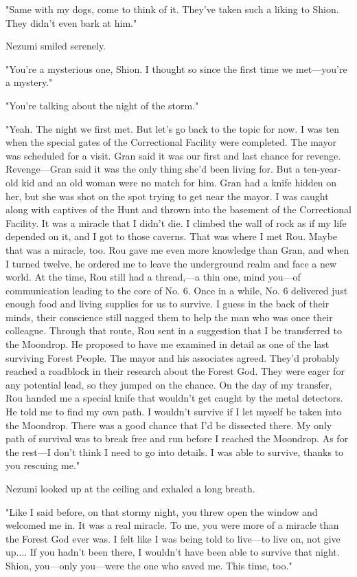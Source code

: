 "Same with my dogs, come to think of it. They've taken such a liking to
Shion. They didn't even bark at him."

Nezumi smiled serenely.

"You're a mysterious one, Shion. I thought so since the first time we
met---you're a mystery."

"You're talking about the night of the storm."

"Yeah. The night we first met. But let's go back to the topic for now. I
was ten when the special gates of the Correctional Facility were
completed. The mayor was scheduled for a visit. Gran said it was our
first and last chance for revenge. Revenge---Gran said it was the only
thing she'd been living for. But a ten-year-old kid and an old woman
were no match for him. Gran had a knife hidden on her, but she was shot
on the spot trying to get near the mayor. I was caught along with
captives of the Hunt and thrown into the basement of the Correctional
Facility. It was a miracle that I didn't die. I climbed the wall of rock
as if my life depended on it, and I got to those caverns. That was where
I met Rou. Maybe that was a miracle, too. Rou gave me even more
knowledge than Gran, and when I turned twelve, he ordered me to leave
the underground realm and face a new world. At the time, Rou still had a
thread,---a thin one, mind you---of communication leading to the core of No.
6. Once in a while, No. 6 delivered just enough food and living supplies
for us to survive. I guess in the back of their minds, their conscience
still nagged them to help the man who was once their colleague. Through
that route, Rou sent in a suggestion that I be transferred to the
Moondrop. He proposed to have me examined in detail as one of the last
surviving Forest People. The mayor and his associates agreed. They'd
probably reached a roadblock in their research about the Forest God.
They were eager for any potential lead, so they jumped on the chance. On
the day of my transfer, Rou handed me a special knife that wouldn't get
caught by the metal detectors. He told me to find my own path. I
wouldn't survive if I let myself be taken into the Moondrop. There was a
good chance that I'd be dissected there. My only path of survival was to
break free and run before I reached the Moondrop. As for the rest---I
don't think I need to go into details. I was able to survive, thanks to
you rescuing me."

Nezumi looked up at the ceiling and exhaled a long breath.

"Like I said before, on that stormy night, you threw open the window and
welcomed me in. It was a real miracle. To me, you were more of a miracle
than the Forest God ever was. I felt like I was being told to live---to
live on, not give up.... If you hadn't been there, I wouldn't have been
able to survive that night. Shion, you---only you---were the one who saved
me. This time, too."

